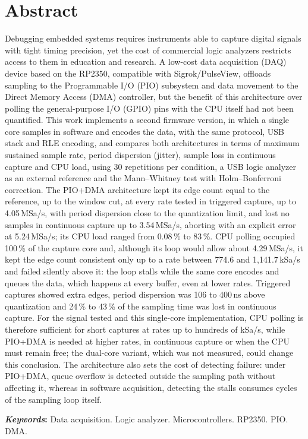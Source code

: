 \chapter*{Abstract}
\noindent
Debugging embedded systems requires instruments able to capture digital
signals with tight timing precision, yet the cost of commercial logic
analyzers restricts access to them in education and research. A low-cost
data acquisition (DAQ) device based on the RP2350, compatible with
Sigrok/PulseView, offloads sampling to the Programmable I/O (PIO) subsystem
and data movement to the Direct Memory Access (DMA) controller, but the
benefit of this architecture over polling the general-purpose I/O (GPIO)
pins with the CPU itself had not been quantified. This work implements a
second firmware version, in which a single core samples in software and
encodes the data, with the same protocol, USB stack and RLE encoding, and
compares both architectures in terms of maximum sustained sample rate,
period dispersion (jitter), sample loss in continuous capture and CPU load,
using 30 repetitions per condition, a USB logic analyzer as an external
reference and the Mann--Whitney test with Holm--Bonferroni correction. The
PIO+DMA architecture kept its edge count equal to the reference, up to the
window cut, at every rate tested in triggered capture, up to 4.05\,MSa/s,
with period dispersion close to the quantization limit, and lost no samples
in continuous capture up to 3.54\,MSa/s, aborting with an explicit error at
5.24\,MSa/s; its CPU load ranged from 0.08\,\% to 83\,\%. CPU polling
occupied 100\,\% of the capture core and, although its loop would allow
about 4.29\,MSa/s, it kept the edge count consistent only up to a rate
between 774.6 and 1,141.7\,kSa/s and failed silently above it: the loop
stalls while the same core encodes and queues the data, which happens at
every buffer, even at lower rates. Triggered captures showed extra edges,
period dispersion was 106 to 400\,ns above quantization and 24\,\% to 43\,\%
of the sampling time was lost in continuous capture. For the signal tested
and this single-core implementation, CPU polling is therefore sufficient for
short captures at rates up to hundreds of kSa/s, while PIO+DMA is needed at
higher rates, in continuous capture or when the CPU must remain free; the
dual-core variant, which was not measured, could change this conclusion. The
architecture also sets the cost of detecting failure: under PIO+DMA, queue
overflow is detected outside the sampling path without affecting it, whereas
in software acquisition, detecting the stalls consumes cycles of the sampling
loop itself.

\vspace{5mm}
\noindent\textbf{\textit{Keywords}:} Data acquisition. Logic analyzer. Microcontrollers. RP2350. PIO. DMA.
